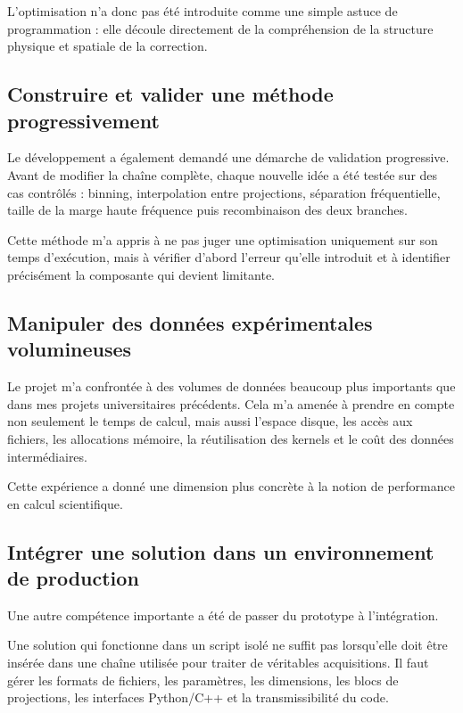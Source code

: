 \documentclass[11pt,a4paper]{report}
\begin{document}
L'optimisation n'a donc pas été introduite comme une simple astuce de
programmation : elle découle directement de la compréhension de la
structure physique et spatiale de la correction.

\subsection{Construire et valider une méthode progressivement}

Le développement a également demandé une démarche de validation
progressive. Avant de modifier la chaîne complète, chaque nouvelle idée a
été testée sur des cas contrôlés : binning, interpolation entre projections,
séparation fréquentielle, taille de la marge haute fréquence puis
recombinaison des deux branches.

Cette méthode m'a appris à ne pas juger une optimisation uniquement sur son
temps d'exécution, mais à vérifier d'abord l'erreur qu'elle introduit et à
identifier précisément la composante qui devient limitante.

\subsection{Manipuler des données expérimentales volumineuses}

Le projet m'a confrontée à des volumes de données beaucoup plus importants
que dans mes projets universitaires précédents. Cela m'a amenée à prendre
en compte non seulement le temps de calcul, mais aussi l'espace disque, les
accès aux fichiers, les allocations mémoire, la réutilisation des kernels
et le coût des données intermédiaires.

Cette expérience a donné une dimension plus concrète à la notion de
performance en calcul scientifique.

\subsection{Intégrer une solution dans un environnement de production}

Une autre compétence importante a été de passer du prototype à
l'intégration.

Une solution qui fonctionne dans un script isolé ne suffit pas lorsqu'elle
doit être insérée dans une chaîne utilisée pour traiter de véritables
acquisitions. Il faut gérer les formats de fichiers, les paramètres, les
dimensions, les blocs de projections, les interfaces Python/C++ et la
transmissibilité du code.
\end{document}
